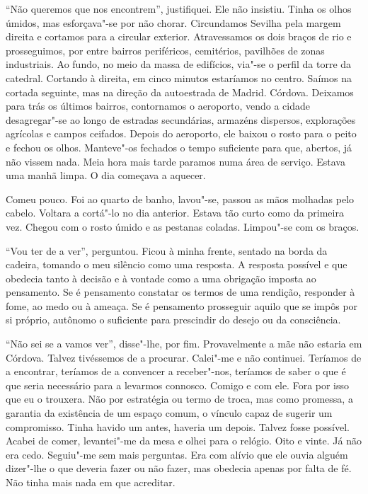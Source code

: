 ``Não queremos que nos encontrem'',
justifiquei. Ele não insistiu. Tinha os olhos úmidos, mas
esforçava"-se por não chorar. Circundamos Sevilha pela margem direita e
cortamos para a circular exterior. Atravessamos os dois braços de rio e
prosseguimos, por entre bairros periféricos, cemitérios, pavilhões de
zonas industriais. Ao fundo, no meio da massa de edifícios, via"-se o
perfil da torre da catedral. Cortando à direita, em cinco minutos
estaríamos no centro. Saímos na cortada seguinte, mas na direção da
autoestrada de Madrid. Córdova. Deixamos para trás os últimos bairros,
contornamos o aeroporto, vendo a cidade desagregar"-se ao longo de
estradas secundárias, armazéns dispersos, explorações agrícolas e campos
ceifados. Depois do aeroporto, ele baixou o rosto para o peito e fechou
os olhos. Manteve"-os fechados o tempo suficiente para que, abertos, já
não vissem nada. Meia hora mais tarde paramos numa área de serviço.
Estava uma manhã limpa. O dia começava a aquecer.

Comeu pouco. Foi ao quarto de banho, lavou"-se, passou as mãos molhadas
pelo cabelo. Voltara a cortá"-lo no dia anterior. Estava tão curto como
da primeira vez. Chegou com o rosto úmido e as pestanas coladas.
Limpou"-se com os braços.

``Vou ter de a ver'',
perguntou. Ficou à minha frente, sentado na borda da cadeira, tomando o
meu silêncio como uma resposta. A resposta possível e que obedecia tanto
à decisão e à vontade como a uma obrigação imposta ao pensamento. Se é
pensamento constatar os termos de uma rendição, responder à fome, ao
medo ou à ameaça. Se é pensamento prosseguir aquilo que se impôs por si
próprio, autônomo o suficiente para prescindir do desejo ou da
consciência.

``Não sei se a vamos ver'',
disse"-lhe, por fim. Provavelmente a mãe não estaria em Córdova. Talvez
tivéssemos de a procurar. Calei"-me e não continuei. Teríamos de a
encontrar, teríamos de a convencer a receber"-nos, teríamos de saber o
que é que seria necessário para a levarmos connosco. Comigo e com ele.
Fora por isso que eu o trouxera. Não por estratégia ou termo de troca,
mas como promessa, a garantia da existência de um espaço comum, o
vínculo capaz de sugerir um compromisso. Tinha havido um antes, haveria
um depois. Talvez fosse possível. Acabei de comer, levantei"-me da mesa
e olhei para o relógio. Oito e vinte. Já não era cedo. Seguiu"-me sem
mais perguntas. Era com alívio que ele ouvia alguém dizer"-lhe o que
deveria fazer ou não fazer, mas obedecia apenas por falta de fé. Não
tinha mais nada em que acreditar.

